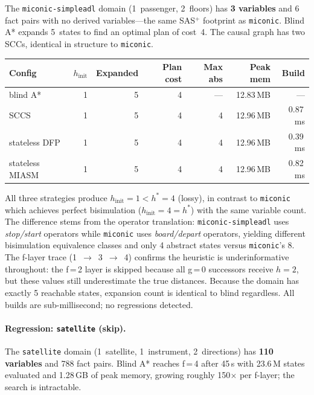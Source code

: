 \documentclass[11pt,a4paper]{article}
\begin{document}
The \texttt{miconic-simpleadl} domain (1~passenger, 2~floors) has \textbf{3 variables}
and 6 fact pairs with no derived variables---the same SAS$^+$ footprint as
\texttt{miconic}.
Blind A* expands 5~states to find an optimal plan of cost~4.
The causal graph has two SCCs, identical in structure to \texttt{miconic}.

\begin{center}
\small
\begin{tabular}{lrrrrrr}
\toprule
\textbf{Config} & \textbf{$h_{\mathrm{init}}$} & \textbf{Expanded}
  & \textbf{Plan cost} & \textbf{Max abs} & \textbf{Peak mem} & \textbf{Build} \\
\midrule
blind A*            & 1 & 5 & 4 & --- & 12.83\,MB & ---     \\
SCCS                & 1 & 5 & 4 &   4 & 12.96\,MB & 0.87\,ms \\
stateless DFP       & 1 & 5 & 4 &   4 & 12.96\,MB & 0.39\,ms \\
stateless MIASM     & 1 & 5 & 4 &   4 & 12.96\,MB & 0.82\,ms \\
\bottomrule
\end{tabular}
\end{center}

All three strategies produce $h_{\mathrm{init}} = 1 < h^* = 4$ (lossy), in
contrast to \texttt{miconic} which achieves perfect bisimulation
($h_{\mathrm{init}} = 4 = h^*$) with the same variable count.
The difference stems from the operator translation: \texttt{miconic-simpleadl}
uses \emph{stop/start} operators while \texttt{miconic} uses \emph{board/depart}
operators, yielding different bisimulation equivalence classes and only 4 abstract
states versus \texttt{miconic}'s 8.
The f-layer trace (1~$\to$~3~$\to$~4) confirms the heuristic is underinformative
throughout: the f\,=\,2 layer is skipped because all g\,=\,0 successors receive
$h = 2$, but these values still underestimate the true distances.
Because the domain has exactly 5 reachable states, expansion count is identical to
blind regardless.
All builds are sub-millisecond; no regressions detected.

\paragraph{Regression: \texttt{satellite} (skip).}

The \texttt{satellite} domain (1~satellite, 1~instrument, 2~directions) has
\textbf{110 variables} and 788 fact pairs.
Blind A* reaches f\,=\,4 after 45\,s with 23.6\,M states evaluated and
1.28\,GB of peak memory, growing roughly 150$\times$ per f-layer; the search
is intractable.
\end{document}
